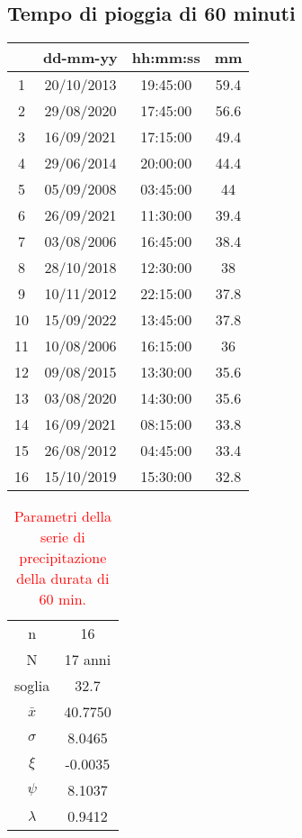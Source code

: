 \subsection{Tempo di pioggia di 60 minuti}
\begin{table}[H] \centering
    \begin{tabular}{cccc}
    \toprule
       & dd-mm-yy   & hh:mm:ss & mm \\
    \midrule
    1  & 20/10/2013 & 19:45:00 & 59.4 \\
    2  & 29/08/2020 & 17:45:00 & 56.6 \\
    3  & 16/09/2021 & 17:15:00 & 49.4 \\
    4  & 29/06/2014 & 20:00:00 & 44.4 \\
    5  & 05/09/2008 & 03:45:00 & 44   \\
    6  & 26/09/2021 & 11:30:00 & 39.4 \\
    7  & 03/08/2006 & 16:45:00 & 38.4 \\
    8  & 28/10/2018 & 12:30:00 & 38   \\
    9  & 10/11/2012 & 22:15:00 & 37.8 \\
    10 & 15/09/2022 & 13:45:00 & 37.8 \\
    11 & 10/08/2006 & 16:15:00 & 36   \\
    12 & 09/08/2015 & 13:30:00 & 35.6 \\
    13 & 03/08/2020 & 14:30:00 & 35.6 \\
    14 & 16/09/2021 & 08:15:00 & 33.8 \\
    15 & 26/08/2012 & 04:45:00 & 33.4 \\
    16 & 15/10/2019 & 15:30:00 & 32.8 \\
    \bottomrule
    \end{tabular}
    \end{table}

    \begin{table}[H] \centering
        \caption{\textcolor{red}{Parametri della serie di precipitazione della durata di 60 min.}}
        \begin{tabular}{cc}
            \toprule
        n        &    16     \\
        N        & 17 anni \\
        soglia   &      32.7   \\
        $\bar{x}$ &    40.7750    \\
        $\sigma$ &     8.0465    \\
        $\xi$      &   -0.0035    \\
        $\psi$      &   8.1037  \\
        $\lambda$   &   0.9412 \\
    \bottomrule    
    \end{tabular}
        \end{table}

